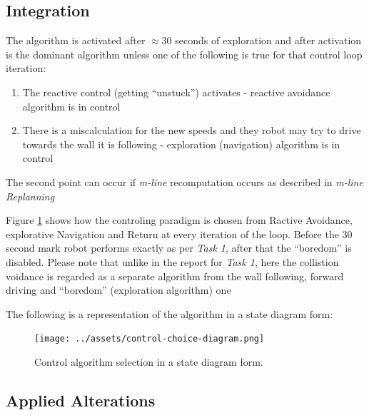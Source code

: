 \documentclass[11pt, a4paper]{article}
\begin{document}

\subsection{Integration}

The algorithm is activated after $\approx 30$ seconds of exploration\cite{task1_report} and after
activation is the dominant algorithm unless one of the following is true for that control loop iteration:

\begin{enumerate}	

	\item The reactive control (getting ``unstuck''\cite{task1_report}) activates - reactive avoidance algorithm is in control
	\item There is a miscalculation for the new speeds and they robot may try to drive towards the wall it is following - exploration (navigation) algorithm is in control

\end{enumerate}

The second point can occur if \textit{m-line} recomputation occurs as described in \textit{m-line Replanning}

Figure \ref{controlflow} shows how the controling paradigm is chosen from Ractive Avoidance, 
explorative Navigation and Return at every iteration of the loop. Before the 30 second mark robot
performs exactly as per \textit{Task 1}, after that the ``boredom''\cite{task1_report} is disabled. 
Please note that unlike in the report for \textit{Task 1}, here the collistion voidance is regarded
as a separate algorithm from the wall following, forward driving and ``boredom'' (exploration algorithm) one

The following is a representation of the algorithm in a state diagram form:
\begin{figure}[H]
  \begin{center}
    \texttt{[image: ../assets/control-choice-diagram.png]}
    \caption{\label{controlflow}Control algorithm selection in a state diagram form.}
  \end{center}
\end{figure} 



\subsection{Applied Alterations}
\label{Needed Alterations}
\end{document}
